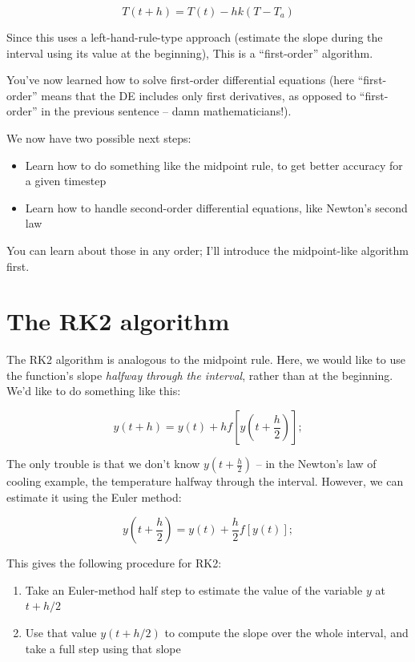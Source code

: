 \documentclass[12ampt]{article}
\begin{document}
\begin{equation}
  T(t+h) = T(t) - hk(T-T_a) 
\end{equation}

Since this uses a left-hand-rule-type approach (estimate the slope during 
the interval using its value at the beginning), This is a ``first-order'' algorithm.

You've now learned how to solve first-order differential equations (here 
``first-order'' means that the DE includes only first derivatives, as 
opposed to ``first-order'' in the previous sentence -- damn mathematicians!).

We now have two possible next steps:

\begin{itemize}
\item Learn how to do something like the midpoint rule, to get better accuracy
for a given timestep
\item Learn how to handle second-order differential equations, like Newton's 
second law
\end{itemize}

You can learn about those in any order; I'll introduce the midpoint-like algorithm 
first.

\section{The RK2 algorithm}

The RK2 algorithm is analogous to the midpoint rule. Here, we would like to use the function's slope {\it halfway through the interval}, rather than at the beginning. We'd like to do something like this:

\begin{equation}
  y(t+h) = y(t) + h f\left[y\left(t+\frac{h}{2}\right)\right];
\end{equation}

The only trouble is that we don't know $y\left(t+\frac{h}{2}\right)$ -- in the Newton's law of cooling example, the temperature halfway through the interval. However, we can estimate it using the Euler method:

\begin{equation}
  y(t+\frac{h}{2}) = y(t) + \frac{h}{2} f\left[y\left(t\right)\right];
\end{equation}

This gives the following procedure for RK2:

\begin{enumerate}

  \item{Take an Euler-method half step to estimate the value of the variable $y$ at $t+h/2$}
  \item{Use that value $y(t+h/2)$ to compute the slope over the whole interval, and take a full step using that slope}
\end{enumerate}
\end{document}
